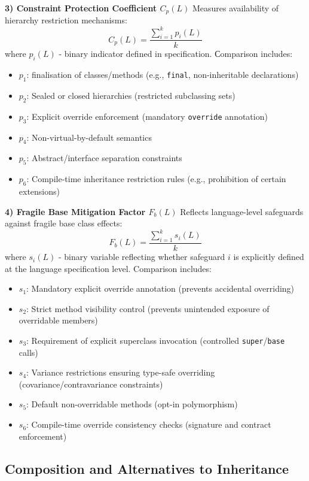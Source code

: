 \textbf{3) Constraint Protection Coefficient $C_p(L)$}
Measures availability of hierarchy restriction mechanisms:
\[
    C_p(L) = \frac{\sum_{i=1}^{k} p_i(L)}{k}
\]
where $p_i(L)$ - binary indicator defined in specification.
Сomparison includes:

\begin{itemize}
    \item $p_1$: finalisation of classes/methods (e.g., \texttt{final}, non-inheritable declarations)
    \item $p_2$: Sealed or closed hierarchies (restricted subclassing sets)
    \item $p_3$: Explicit override enforcement (mandatory \texttt{override} annotation)
    \item $p_4$: Non-virtual-by-default semantics
    \item $p_5$: Abstract/interface separation constraints
    \item $p_6$: Compile-time inheritance restriction rules (e.g., prohibition of certain extensions)
\end{itemize}


\textbf{4) Fragile Base Mitigation Factor $F_b(L)$}
Reflects language-level safeguards against fragile base class effects:
\[
    F_b(L) = \frac{\sum_{i=1}^{k} s_i(L)}{k}
\]
where $s_i(L)$ - binary variable reflecting whether safeguard $i$ is explicitly defined at the language specification level.
Comparison includes:
\begin{itemize}
    \item $s_1$: Mandatory explicit override annotation (prevents accidental overriding)
    \item $s_2$: Strict method visibility control (prevents unintended exposure of overridable members)
    \item $s_3$: Requirement of explicit superclass invocation (controlled \texttt{super}/\texttt{base} calls)
    \item $s_4$: Variance restrictions ensuring type-safe overriding (covariance/contravariance constraints)
    \item $s_5$: Default non-overridable methods (opt-in polymorphism)
    \item $s_6$: Compile-time override consistency checks (signature and contract enforcement)
\end{itemize}

\subsection{Composition and Alternatives to Inheritance}

